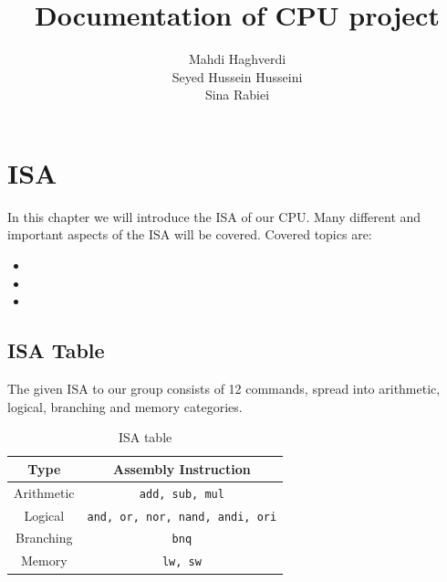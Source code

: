 \documentclass[12pt, dvipsnames, svgnames, x11names, oneside]{book}
\title{Documentation of CPU project}
\author{
	Mahdi Haghverdi \\
	Seyed Hussein Husseini \\
	Sina Rabiei
}
\newenvironment{sansserif}{\sffamily}{\normalfont}
\begin{document}
	\maketitle
	\frontmatter
	\tableofcontents
	\mainmatter
	
	\chapter{ISA}\label{ch:isa}
		\begin{sansserif}
			In this chapter we will introduce the ISA of our CPU. Many different and important aspects of the ISA will be covered. Covered topics are:
            \begin{itemize}
				\item {}
				\item {}
				\item {}
			\end{itemize}
		\end{sansserif}
				
		\section{ISA Table}\label{sec:isa-table}
			The given ISA to our group consists of 12 commands, spread into arithmetic, logical, branching and memory categories.
			
			\begin{table}[hb]
				\caption{ISA table}
				\begin{center}
					\begin{tabular}{|c|c|}
						\hline
						Type & Assembly Instruction \\
						\hline
						\hline
						Arithmetic & \texttt{add, sub, mul} \\
						\hline
						Logical & \texttt{and, or, nor, nand, andi, ori} \\
						\hline
						Branching & \texttt{bnq} \\
						\hline
						Memory & \texttt{lw, sw} \\
						\hline
					\end{tabular}
				\end{center}
			\end{table}\label{sec:table:isa-table}
		
\end{document}
